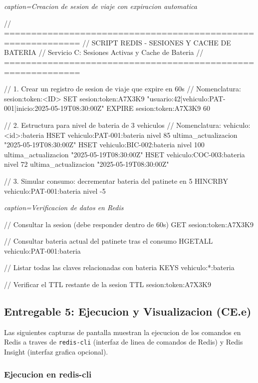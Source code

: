 \documentclass[12pt,a4paper]{article}
\newenvironment{lstlisting}[1][]{%
  \par\noindent\textit{\footnotesize #1}\par\nopagebreak\par\noindent
  \verbatim
}{%
  \endverbatim
}
\begin{document}
\begin{lstlisting}[caption=Creacion de sesion de viaje con expiracion automatica]
// ============================================================
// SCRIPT REDIS - SESIONES Y CACHE DE BATERIA
// Servicio C: Sesiones Activas y Cache de Bateria
// ============================================================

// 1. Crear un registro de sesion de viaje que expire en 60s
//    Nomenclatura: sesion:token:<ID>
SET sesion:token:A7X3K9 "usuario:42|vehiculo:PAT-001|inicio:2025-05-19T08:30:00Z"
EXPIRE sesion:token:A7X3K9 60

// 2. Estructura para nivel de bateria de 3 vehiculos
//    Nomenclatura: vehiculo:<id>:bateria
HSET vehiculo:PAT-001:bateria nivel 85 ultima_actualizacion "2025-05-19T08:30:00Z"
HSET vehiculo:BIC-002:bateria nivel 100 ultima_actualizacion "2025-05-19T08:30:00Z"
HSET vehiculo:COC-003:bateria nivel 72 ultima_actualizacion "2025-05-19T08:30:00Z"

// 3. Simular consumo: decrementar bateria del patinete en 5%
HINCRBY vehiculo:PAT-001:bateria nivel -5
\end{lstlisting}

\begin{lstlisting}[caption=Verificacion de datos en Redis]
// Consultar la sesion (debe responder dentro de 60s)
GET sesion:token:A7X3K9

// Consultar bateria actual del patinete tras el consumo
HGETALL vehiculo:PAT-001:bateria

// Listar todas las claves relacionadas con bateria
KEYS vehiculo:*:bateria

// Verificar el TTL restante de la sesion
TTL sesion:token:A7X3K9
\end{lstlisting}

\newpage

\subsection{Entregable 5: Ejecucion y Visualizacion (CE.e)}

Las siguientes capturas de pantalla muestran la ejecucion de los comandos en Redis a traves de \texttt{redis-cli} (interfaz de linea de comandos de Redis) y Redis Insight (interfaz grafica opcional).

\subsubsection{Ejecucion en redis-cli}
\end{document}

